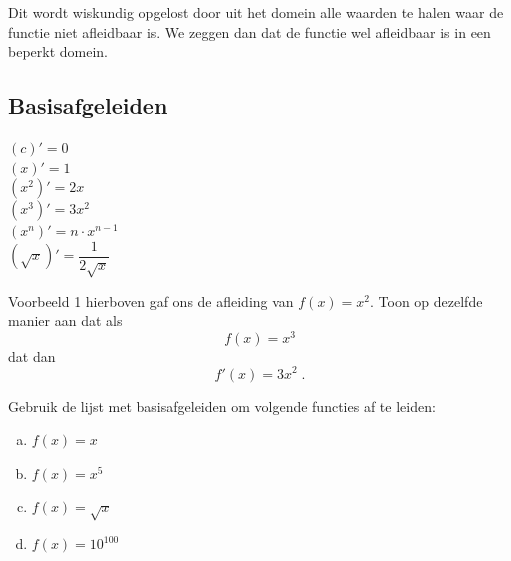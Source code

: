 \documentclass[12pt]{article}
\newenvironment{kader}
{
  \begin{mdframed}[nobreak=true]
  }{%
  \end{mdframed}
}
\begin{document}
Dit wordt wiskundig opgelost door uit het domein alle waarden te halen waar de functie niet afleidbaar is. We zeggen dan dat de functie wel afleidbaar is in een beperkt domein.

\subsection{Basisafgeleiden}

\begin{kader}
  \begin{multicols}{3}
    $\left(c\right)'=0$\\
    $\left(x\right)'=1$\\
    $\left(x^2\right)'=2x$\\
    $\left(x^3\right)'=3x^2$\\
    $\left(x^n\right)'=n\cdot x^{n-1}$\\
    $\left(\sqrt{x}\right)'=\dfrac{1}{2\sqrt{x}}$\\
  \end{multicols}
\end{kader}

\begin{oefening}
  Voorbeeld 1 hierboven gaf ons de afleiding van $f(x)=x^2$. Toon op dezelfde manier aan dat als
  $$f(x)=x^3$$
  dat dan
  $$f'(x)=3x^2\;.$$
\end{oefening}

\begin{oefening}
Gebruik de lijst met basisafgeleiden om volgende functies af te leiden:
\begin{enumerate}[(a)]
  \item $f(x)=x$
  \item $f(x)=x^5$
  \item $f(x)=\sqrt{x}$
  \item $f(x)=10^{100}$
\end{enumerate}
\end{oefening}
\end{document}
